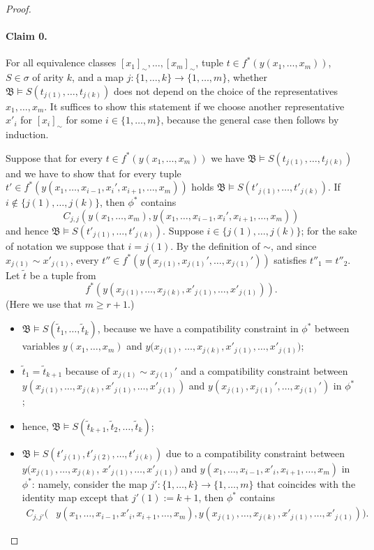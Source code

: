 \documentclass[nonacm]{acmart}
\newcommand{\bB}{{\mathfrak B}}
\begin{document}
\begin{proof}
\paragraph{Claim 0.} For all equivalence classes $[x_1]_\sim,\dots,[x_m]_\sim$, tuple $t \in f^*(y(x_1,\dots,x_m))$, $S \in \sigma$ of arity $k$, and a map $j \colon \{1, \dots, k\} \rightarrow \{1, \dots, m\}$,
whether 
$\bB \models S(t_{j(1)},\dots,t_{j(k)})$ does not depend on the choice of the representatives $x_{1},\dots,x_{m}$. 
It suffices to show this statement if we choose another representative $x'_i$ for $[x_i]_\sim$ for some $i \in \{1, \dots, m\}$, because the general case then follows by induction. 

Suppose that for every $t \in f^*(y(x_1,\dots,x_m))$ we have $\bB \models S(t_{j(1)},\dots,t_{j(k)})$ and we have to show that for every tuple $t' \in f^*(y(x_1,\dots,x_{i-1},x_i',x_{i+1},\dots,x_m))$ 
holds $\bB \models S(t'_{j(1)},\dots,t'_{j(k)})$. 
If $i \notin \{j(1),\dots,j(k)\}$, 
then $\phi^*$ contains $$C_{j,j}(y(x_1,\dots,x_m),y(x_1,\dots,x_{i-1},x_i',x_{i+1},\dots,x_m))$$
and hence 
$\bB \models S(t'_{j(1)},\dots,t'_{j(k)})$. 
Suppose $i \in \{j(1),\dots,j(k)\}$; for the sake of notation we suppose that $i=j(1)$. 
By the definition of $\sim$, and since $x_{j(1)} \sim x'_{j(1)}$, every 
 $t'' \in f^*(y(x_{j(1)},x_{j(1)}',\dots,x_{j(1)}'))$ satisfies $t''_1 = t''_2$. 
Let $\tilde t$ be a tuple from 
$$f^*(y(x_{j(1)},\dots,x_{j(k)},x'_{j(1)},\dots,x'_{j(1)})).$$  
(Here we use that $m \geq r+1$.)
\begin{itemize}
    \item $\bB \models S(\tilde t_{1},\dots,\tilde t_{k})$, because we have a compatibility constraint in $\phi^*$ between variables
$y(x_1,\dots,x_m)$ and $y(x_{j(1)}$,
$\dots,x_{j(k)},x'_{j(1)},\dots,x'_{j(1)})$; 
\item $\tilde t_1 = \tilde t_{k+1}$ because of $x_{j(1)}\sim x_{j(1)}'$  and a compatibility constraint between 
$y(x_{j(1)},\dots,x_{j(k)},x'_{j(1)},\dots,x'_{j(1)})$ and $y(x_{j(1)},x_{j(1)}',\dots,x_{j(1)}')$ 
in $\phi^*$; 
\item hence, $\bB \models S(\tilde t_{k+1},\tilde t_2,\dots,\tilde t_k)$; 
\item $\bB \models S(t'_{j(1)},t'_{j(2)},\dots,t'_{j(k)})$ 
due to a compatibility constraint between $y(x_{j(1)},\dots,x_{j(k)}$,
$x'_{j(1)},\dots,x'_{j(1)})$ and $y(x_1,\dots,x_{i-1},x'_i,x_{i+1},\dots,x_m)$
in $\phi^*$:
namely, consider the map $j' \colon \{1, \dots, k\} \to \{1, \dots, m \}$ that coincides with the identity map except that $j'(1) := k+1$, then $
\phi^*$ contains 
\begin{align*}
    C_{j,j'} \big (& y(x_1,\dots,x_{i-1},x'_{i},x_{i+1},\dots,x_m), y(x_{j(1)},\dots,x_{j(k)},x'_{j(1)},\dots,x'_{j(1)}) \big ).
\end{align*}
\end{itemize}


\end{proof}
\end{document}
